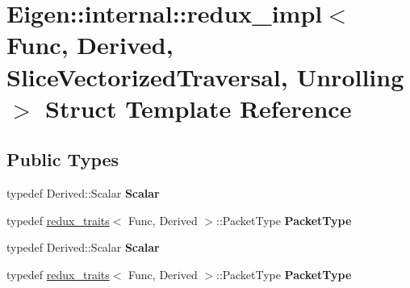 \hypertarget{struct_eigen_1_1internal_1_1redux__impl_3_01_func_00_01_derived_00_01_slice_vectorized_traversal_00_01_unrolling_01_4}{}\section{Eigen\+:\+:internal\+:\+:redux\+\_\+impl$<$ Func, Derived, Slice\+Vectorized\+Traversal, Unrolling $>$ Struct Template Reference}
\label{struct_eigen_1_1internal_1_1redux__impl_3_01_func_00_01_derived_00_01_slice_vectorized_traversal_00_01_unrolling_01_4}
\subsection*{Public Types}
\begin{DoxyCompactItemize}
\item 
\mbox{\label{struct_eigen_1_1internal_1_1redux__impl_3_01_func_00_01_derived_00_01_slice_vectorized_traversal_00_01_unrolling_01_4_a8b28971f75581d5de136af071dc9aae3}} 
typedef Derived\+::\+Scalar {\bfseries Scalar}
\item 
\mbox{\label{struct_eigen_1_1internal_1_1redux__impl_3_01_func_00_01_derived_00_01_slice_vectorized_traversal_00_01_unrolling_01_4_a919789f56768fcdf6469b8132705fa4b}} 
typedef \hyperlink{struct_eigen_1_1internal_1_1redux__traits}{redux\+\_\+traits}$<$ Func, Derived $>$\+::Packet\+Type {\bfseries Packet\+Type}
\item 
\mbox{\label{struct_eigen_1_1internal_1_1redux__impl_3_01_func_00_01_derived_00_01_slice_vectorized_traversal_00_01_unrolling_01_4_a8b28971f75581d5de136af071dc9aae3}} 
typedef Derived\+::\+Scalar {\bfseries Scalar}
\item 
\mbox{\label{struct_eigen_1_1internal_1_1redux__impl_3_01_func_00_01_derived_00_01_slice_vectorized_traversal_00_01_unrolling_01_4_a919789f56768fcdf6469b8132705fa4b}} 
typedef \hyperlink{struct_eigen_1_1internal_1_1redux__traits}{redux\+\_\+traits}$<$ Func, Derived $>$\+::Packet\+Type {\bfseries Packet\+Type}
\end{DoxyCompactItemize}
